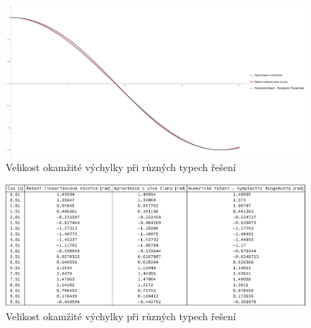 \begin{figure}[h]
  \centering
  \includegraphics[width=15cm]{figures/ZAVER1.pdf}
  \caption{Velikost okamžité výchylky při různých typech řešení}
  \label{fig:zav1}
\end{figure}

\begin{figure}[h]
  \centering
  \includegraphics[width=15cm]{figures/ZAVER1-TAB.pdf}
  \caption{Velikost okamžité výchylky při různých typech řešení}
  \label{fig:zav2}
\end{figure}

